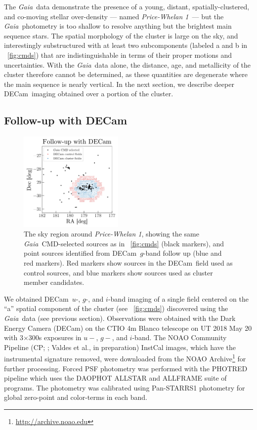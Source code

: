 \documentclass[twocolumn]{aastex62}
\newcommand{\gaia}{\textsl{Gaia}}
\newcommand{\decam}{DECam}
\newcommand{\clustername}{\textsl{Price-Whelan 1}}
\begin{document}
The \gaia\ data demonstrate the presence of a young, distant, spatially-clustered, and co-moving stellar over-density --- named \clustername\ --- but the \gaia\ photometry is too shallow to resolve anything but the brightest main sequence stars.
The spatial morphology of the cluster is large on the sky, and interestingly substructured with at least two subcomponents (labeled a and b in \figurename~\ref{fig:cmds}) that are indistinguishable in terms of their proper motions and uncertainties.
With the \gaia\ data alone, the distance, age, and metallicity of the cluster therefore cannot be determined, as these quantities are degenerate where the main sequence is nearly vertical.
In the next section, we describe deeper \decam\ imaging obtained over a portion of the cluster.

\subsection{Follow-up with \decam}
\label{sec:decam}

\begin{figure}[t!]
\centering
\includegraphics[width=0.45\textwidth]{figures/DECam-field.pdf}
\caption{The sky region around \clustername, showing the same \gaia\ CMD-selected sources as in \figurename~\ref{fig:cmds} (black markers), and point sources identified from \decam\ $g$-band follow up (blue and red markers).
Red markers show sources in the \decam\ field used as control sources, and blue markers show sources used as cluster member candidates.}
\label{fig:decam-field}
\end{figure}

We obtained \decam\ $u$-, $g$-, and $i$-band imaging of a single field centered on the ``a'' spatial component of the cluster (see \figurename~\ref{fig:cmds}) discovered using the \gaia\ data (see previous section).  Observations were obtained with the Dark Energy Camera (DECam) on the CTIO 4m Blanco telescope on UT 2018 May 20 with 3$\times$300s
exposures in $u-$, $g-$, and $i$-band.  The NOAO Community Pipeline (CP; \citealt{Valdes:2014}; Valdes et al., in preparation) InstCal images, which have the instrumental signature removed, were downloaded from the NOAO Archive\footnote{\url{http://archive.noao.edu}} for further processing.  Forced PSF photometry was performed with the PHOTRED pipeline \citep{Nidever:2017} which uses the DAOPHOT ALLSTAR \citep{Stetson:1987} and ALLFRAME \citep{Stetson:1994} suite of programs.  The photometry was calibrated using Pan-STARRS1 \citep[PS1;][]{Chambers:2016} photometry for global zero-point and color-terms in each band.
\end{document}
